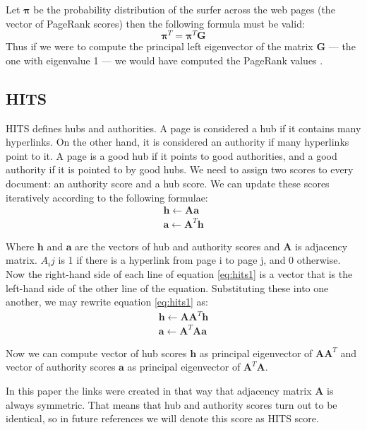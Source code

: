 \documentclass[10pt, a4paper]{article}
\begin{document}
Let $\boldsymbol{\pi}$ be the probability distribution of the surfer across the web pages (the vector of PageRank scores) then the following formula must be valid:
$$
\boldsymbol{\pi}^T = \boldsymbol{\pi}^T \mathbf{G}
$$
Thus if we were to compute the principal left eigenvector of the matrix \textbf{G} — the one with eigenvalue 1 — we would have computed the PageRank values \citep{manning2008introduction}.

\subsection{HITS}
HITS defines hubs and authorities. A page is considered a hub if it contains many hyperlinks. On the other hand, it is considered an authority if many hyperlinks point to it. A page is a good hub if it points to good authorities, and a good authority if it is pointed to by good hubs. We need to assign two scores to every document: an authority score and a hub score. We can update these scores iteratively according to the following formulae:
\begin{equation}
  \label {eq:hits1}
\begin{gathered} 
\mathbf{h} \leftarrow \mathbf{A}\mathbf{a} \\
\mathbf{a} \leftarrow \mathbf{A}^T\mathbf{h} 
\end{gathered}
\end{equation}

Where $\mathbf{h}$ and $\mathbf{a}$ are the vectors of hub and authority scores and $\mathbf{A}$ is adjacency matrix. $A_ij$ 
is 1 if there is a hyperlink from page i to page j, and 0 otherwise.
Now the right-hand side of each line of equation \ref{eq:hits1} is a vector that is the left-hand side of the other line of the equation.
Substituting these into one another, we may rewrite equation \ref{eq:hits1} as:
\begin{equation}
  \label {eq:hits2}
\begin{gathered} 
\mathbf{h} \leftarrow \mathbf{A}\mathbf{A}^T\mathbf{h} \\
\mathbf{a} \leftarrow \mathbf{A}^T\mathbf{A}\mathbf{a} 
\end{gathered}
\end{equation}

Now we can compute vector of hub scores $\mathbf{h}$ as principal eigenvector of $\mathbf{A}\mathbf{A}^T$ and vector of authority
scores $\mathbf{a}$ as principal
eigenvector of $\mathbf{A}^T\mathbf{A}$.

In this paper the links were created in that way that adjacency matrix $\mathbf{A}$ is always symmetric. That means that hub and authority scores
turn out to be identical, so in future references we will denote this score as HITS score.
\end{document}
